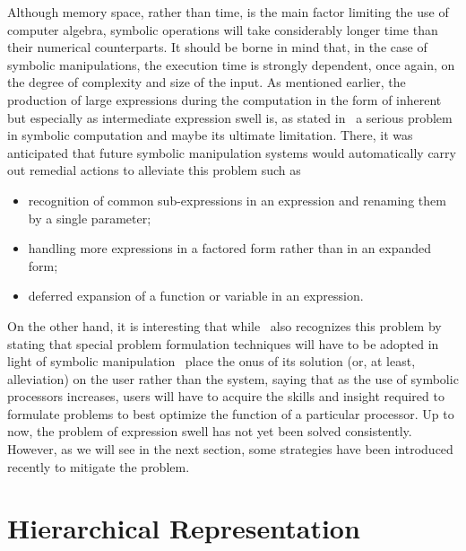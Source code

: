 Although memory space, rather than time, is the main factor limiting the use of computer algebra, symbolic operations will take considerably longer time than their numerical counterparts. It should be borne in mind that, in the case of symbolic manipulations, the execution time is strongly dependent, once again, on the degree of complexity and size of the input. As mentioned earlier, the production of large expressions during the computation in the form of inherent but especially as intermediate expression swell is, as stated in~\citet{noor1979computerized} a serious problem in symbolic computation and maybe its ultimate limitation. There, it was anticipated that future symbolic manipulation systems would automatically carry out remedial actions to alleviate this problem such as
%
\begin{itemize}
  \setlength\itemsep{0.0em}
  \item recognition of common sub-expressions in an expression and renaming them by a single parameter;
  \item handling more expressions in a factored form rather than in an expanded form;
  \item deferred expansion of a function or variable in an expression.
\end{itemize}
%
On the other hand, it is interesting that while~\citet{korncoff1979symbolic} also recognizes this problem by stating that special problem formulation techniques will have to be adopted in light of symbolic manipulation~\citeauthor{korncoff1979symbolic} place the onus of its solution (or, at least, alleviation) on the user rather than the system, saying that as the use of symbolic processors increases, users will have to acquire the skills and insight required to formulate problems to best optimize the function of a particular processor. Up to now, the problem of expression swell has not yet been solved consistently. However, as we will see in the next section, some strategies have been introduced recently to mitigate the problem.


\section{Hierarchical Representation}
\label{chap3:sec:lem}


